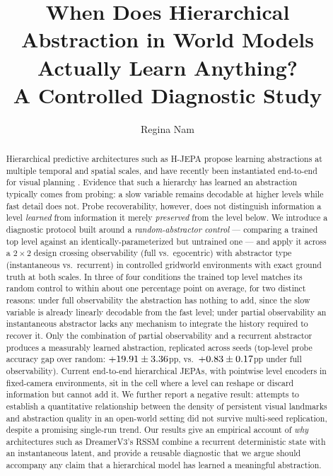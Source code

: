 \documentclass[11pt]{article}
\title{When Does Hierarchical Abstraction in World Models Actually Learn Anything?\\
\large A Controlled Diagnostic Study}
\author[1]{Regina Nam}
\affil[1]{Ionosphere Institute}
\date{}
\begin{document}
\maketitle

\begin{abstract}
Hierarchical predictive architectures such as H-JEPA \citep{lecun2022path} propose learning abstractions at multiple temporal and spatial scales, and have recently been instantiated end-to-end for visual planning \citep{zhang2026hjepa}. Evidence that such a hierarchy has learned an abstraction typically comes from probing: a slow variable remains decodable at higher levels while fast detail does not. Probe recoverability, however, does not distinguish information a level \emph{learned} from information it merely \emph{preserved} from the level below. We introduce a diagnostic protocol built around a \emph{random-abstractor control} --- comparing a trained top level against an identically-parameterized but untrained one --- and apply it across a $2\times2$ design crossing observability (full vs.\ egocentric) with abstractor type (instantaneous vs.\ recurrent) in controlled gridworld environments with exact ground truth at both scales. In three of four conditions the trained top level matches its random control to within about one percentage point on average, for two distinct reasons: under full observability the abstraction has nothing to add, since the slow variable is already linearly decodable from the fast level; under partial observability an instantaneous abstractor lacks any mechanism to integrate the history required to recover it. Only the combination of partial observability and a recurrent abstractor produces a measurably learned abstraction, replicated across \TEgoRecN{} seeds (top-level probe accuracy gap over random: $+19.91\pm3.36$pp, vs.\ $+0.83\pm0.17$pp under full observability). Current end-to-end hierarchical JEPAs, with pointwise level encoders in fixed-camera environments, sit in the cell where a level can reshape or discard information but cannot add it. We further report a negative result: attempts to establish a quantitative relationship between the density of persistent visual landmarks and abstraction quality in an open-world setting did not survive multi-seed replication, despite a promising single-run trend. Our results give an empirical account of \emph{why} architectures such as DreamerV3's RSSM \citep{hafner2023dreamerv3} combine a recurrent deterministic state with an instantaneous latent, and provide a reusable diagnostic that we argue should accompany any claim that a hierarchical model has learned a meaningful abstraction.
\end{abstract}
\end{document}
